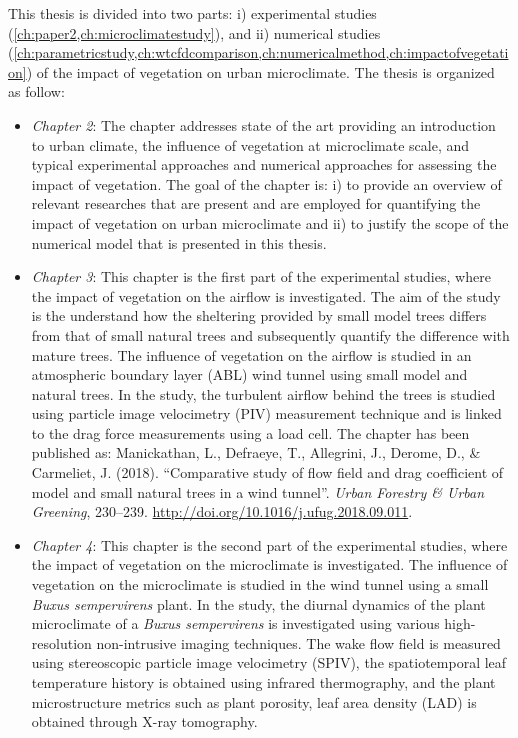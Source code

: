 This thesis is divided into two parts: i) experimental studies (\cref{ch:paper2,ch:microclimatestudy}), and ii) numerical studies (\cref{ch:parametricstudy,ch:wtcfdcomparison,ch:numericalmethod,ch:impactofvegetation}) of the impact of vegetation on urban microclimate. The thesis is organized as follow:
\begin{itemize}
	\item \textit{Chapter 2}: The chapter addresses state of the art providing an introduction to urban climate, the influence of vegetation at microclimate scale, and typical experimental approaches and numerical approaches for assessing the impact of vegetation. The goal of the chapter is: i) to provide an overview of relevant researches that are present and are employed for quantifying the impact of vegetation on urban microclimate and ii) to justify the scope of the numerical model that is presented in this thesis. 

	\item \textit{Chapter 3}: This chapter is the first part of the experimental studies, where the impact of vegetation on the airflow is investigated. The aim of the study is the understand how the sheltering provided by small model trees differs from that of small natural trees and subsequently quantify the difference with mature trees. The influence of vegetation on the airflow is studied in an atmospheric boundary layer (ABL) wind tunnel using small model and natural trees. In the study, the turbulent airflow behind the trees is studied using particle image velocimetry (PIV) measurement technique and is linked to the drag force measurements using a load cell. The chapter has been published as: Manickathan, L., Defraeye, T., Allegrini, J., Derome, D., \& Carmeliet, J. (2018). ``Comparative study of flow field and drag coefficient of model and small natural trees in a wind tunnel''. \textit{Urban Forestry \& Urban Greening}, 230–239. \url{http://doi.org/10.1016/j.ufug.2018.09.011}.	

	\item \textit{Chapter 4}: This chapter is the second part of the experimental studies, where the impact of vegetation on the microclimate is investigated. The influence of vegetation on the microclimate is studied in the wind tunnel using a small \textit{Buxus sempervirens} plant. In the study, the diurnal dynamics of the plant microclimate of a \textit{Buxus sempervirens} is investigated using various high-resolution non-intrusive imaging techniques. The wake flow field is measured using stereoscopic particle image velocimetry (SPIV), the spatiotemporal leaf temperature history is obtained using infrared thermography, and the plant microstructure metrics such as plant porosity, leaf area density (LAD) is obtained through X-ray tomography.


\end{itemize}
